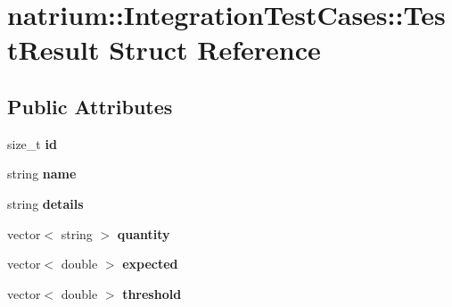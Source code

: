 \hypertarget{structnatrium_1_1IntegrationTestCases_1_1TestResult}{
\section{natrium::IntegrationTestCases::TestResult Struct Reference}
\label{structnatrium_1_1IntegrationTestCases_1_1TestResult}
}
\subsection*{Public Attributes}
\begin{DoxyCompactItemize}
\item 
\hypertarget{structnatrium_1_1IntegrationTestCases_1_1TestResult_a30a8d5f69e4e0d7035a0437f3834b34e}{
size\_\-t {\bfseries id}}
\label{structnatrium_1_1IntegrationTestCases_1_1TestResult_a30a8d5f69e4e0d7035a0437f3834b34e}

\item 
\hypertarget{structnatrium_1_1IntegrationTestCases_1_1TestResult_a2a693e3dab3142fb650e7a6510ff89a7}{
string {\bfseries name}}
\label{structnatrium_1_1IntegrationTestCases_1_1TestResult_a2a693e3dab3142fb650e7a6510ff89a7}

\item 
\hypertarget{structnatrium_1_1IntegrationTestCases_1_1TestResult_af2e7a31b6543fe34f022156030945683}{
string {\bfseries details}}
\label{structnatrium_1_1IntegrationTestCases_1_1TestResult_af2e7a31b6543fe34f022156030945683}

\item 
\hypertarget{structnatrium_1_1IntegrationTestCases_1_1TestResult_a105402717441e46091e7be8106861f58}{
vector$<$ string $>$ {\bfseries quantity}}
\label{structnatrium_1_1IntegrationTestCases_1_1TestResult_a105402717441e46091e7be8106861f58}

\item 
\hypertarget{structnatrium_1_1IntegrationTestCases_1_1TestResult_a10182792d7b4027342ab4368bfa44fb6}{
vector$<$ double $>$ {\bfseries expected}}
\label{structnatrium_1_1IntegrationTestCases_1_1TestResult_a10182792d7b4027342ab4368bfa44fb6}

\item 
\hypertarget{structnatrium_1_1IntegrationTestCases_1_1TestResult_ad69e1b2e302d7b55272e87bc46ca513b}{
vector$<$ double $>$ {\bfseries threshold}}
\label{structnatrium_1_1IntegrationTestCases_1_1TestResult_ad69e1b2e302d7b55272e87bc46ca513b}


\end{DoxyCompactItemize}

